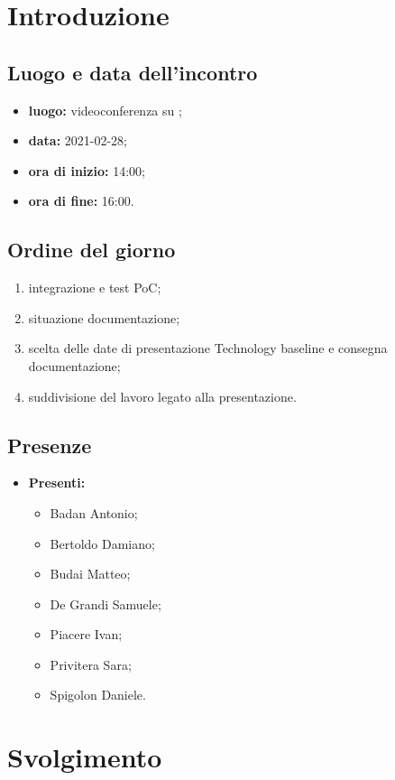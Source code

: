 \section*{Introduzione}
\subsection*{Luogo e data dell'incontro}
\begin{itemize}
	\item \textbf{luogo:} videoconferenza su ;
	\item \textbf{data:}  2021-02-28;
	\item \textbf{ora di inizio:} 14:00;
	\item \textbf{ora di fine:} 16:00.
\end{itemize}

\subsection*{Ordine del giorno}
\begin{enumerate}
	\item integrazione e test PoC;
	\item situazione documentazione;
	\item scelta delle date di presentazione Technology baseline e consegna documentazione;
	\item suddivisione del lavoro legato alla presentazione.
\end{enumerate}

\subsection*{Presenze}
\begin{itemize}
	\item \textbf{Presenti:}
	\begin{itemize}
		\item Badan Antonio;
		\item Bertoldo Damiano;
		\item Budai Matteo;
		\item De Grandi Samuele;
		\item Piacere Ivan;
		\item Privitera Sara;
		\item Spigolon Daniele.
	\end{itemize}
\end{itemize}

\section*{Svolgimento}
